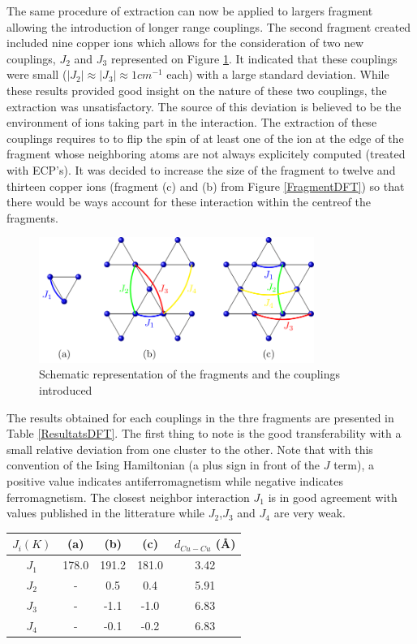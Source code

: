 \documentclass[12pt]{report}
\numberwithin{equation}{section}
\begin{document}
The same procedure of extraction can now be applied to largers fragment allowing the introduction of longer range couplings.
The second fragment created included nine copper ions which allows for the consideration of two new couplings, $J_2$ and $J_3$ represented on Figure \ref{CouplageDFT}.
It indicated that these couplings were small ($|J_{2}|\approx |J_{3}|\approx1 cm^{-1}$ each) with a large standard deviation.
While these results provided good insight on the nature of these two couplings, the extraction was unsatisfactory.
The source of this deviation is believed to be the environment of ions taking part in the interaction. 
The extraction of these couplings requires to to flip the spin of at least one of the ion at the edge of the fragment whose neighboring atoms are not always explicitely computed (treated with ECP's).
It was decided to increase the size of the fragment to twelve and thirteen copper ions (fragment (c) and (b) from Figure \ref{FragmentDFT}) so that there would be ways account for these interaction within the centreof the fragments.


\begin{figure}[!ht]
    \centering
    \includegraphics[width=0.8\textwidth]{Images/ModeleDFT_plan.png}
    \caption{Schematic representation of the fragments and the couplings introduced}
    \label{CouplageDFT}
\end{figure}

The results obtained for each couplings in the thre fragments are presented in Table \ref{ResultatsDFT}.
The first thing to note is the good transferability with a small relative deviation from one cluster to the other.
Note that with this convention of the Ising Hamiltonian (a plus sign in front of the $J$ term), a positive value indicates antiferromagnetism while negative indicates ferromagnetism.
The closest neighbor interaction $J_1$ is in good agreement with values published in the litterature while $J_2$,$J_3$ and $J_4$ are very weak. 

\begin{center}\label{ResultatsDFT}
    \begin{tabular}{c c c c c}
        \hline
        $J_i (K)$ & (a) & (b) & (c) & $d_{Cu-Cu}$ (\AA{}) \\
        \hline
        $J_1$ & 178.0 & 191.2 & 181.0 &3.42\\
        $J_2$ & - & 0.5  & 0.4& 5.91\\
        $J_3$ & -& -1.1& -1.0&6.83\\
        $J_4$ & -& -0.1 & -0.2& 6.83\\
        \hline
    \end{tabular}
\end{center}
\end{document}
